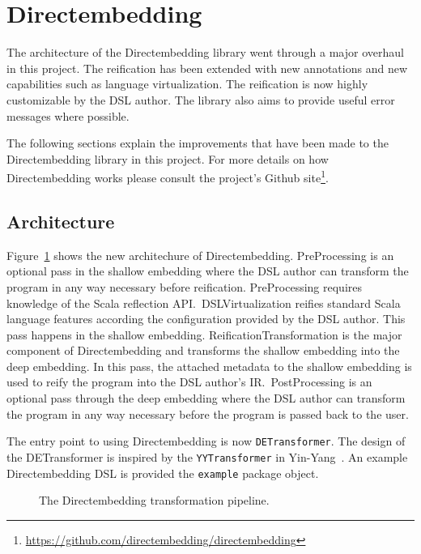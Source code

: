 \section{Directembedding} %
\label{sec:Directembedding}
The architecture of the Directembedding library went through a major overhaul in this project.
The reification has been extended with new annotations and new capabilities such as language virtualization.
The reification is now highly customizable by the DSL author.
The library also aims to provide useful error messages where possible.

The following sections explain the improvements that have been made to the Directembedding library in this project.
For more details on how Directembedding works please consult the project's Github site\footnote{\href{https://github.com/directembedding/directembedding}{https://github.com/directembedding/directembedding}}.

\subsection{Architecture} %
\label{sub:Architecture}
Figure~\ref{fig:pipeline} shows the new architechure of Directembedding.
PreProcessing is an optional pass in the shallow embedding where the DSL author can transform the program in any way necessary before reification.
PreProcessing requires knowledge of the Scala reflection API.\
DSLVirtualization reifies standard Scala language features according the configuration provided by the DSL author.
This pass happens in the shallow embedding.
ReificationTransformation is the major component of Directembedding and transforms the shallow embedding into the deep embedding.
In this pass, the attached metadata to the shallow embedding is used to reify the program into the DSL author's IR.\
PostProcessing is an optional pass through the deep embedding where the DSL author can transform the program in any way necessary before the program is passed back to the user.

The entry point to using Directembedding is now \texttt{DETransformer}.
The design of the DETransformer is inspired by the \texttt{YYTransformer} in Yin-Yang~\autocite{jovanovic_yin-yang:_2014}.
An example Directembedding DSL is provided the \texttt{example} package object.

\begin{figure}
    \centering
    \caption{The Directembedding transformation pipeline.}\label{fig:pipeline}
\end{figure}

